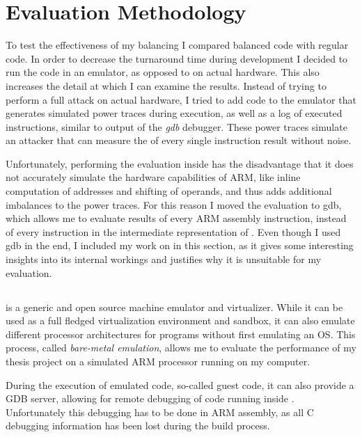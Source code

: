 \chapter{Evaluation Methodology}
\label{evaluation}
To test the effectiveness of my balancing I compared balanced code with regular code.
In order to decrease the turnaround time during development I decided to run the code in an emulator, as opposed to on actual hardware.
This also increases the detail at which I can examine the results.
Instead of trying to perform a full \poweranalysis{} attack on actual hardware, I tried to add code to the \qemu{} emulator that generates simulated power traces during execution, as well as a log of executed instructions, similar to output of the \emph{gdb} debugger.
These power traces simulate an attacker that can measure the \hammingw{} of every single instruction result without noise.

Unfortunately, performing the evaluation inside \qemu{} has the disadvantage that it does not accurately simulate the hardware capabilities of ARM, like inline computation of addresses and shifting of operands, and thus adds additional imbalances to the power traces.
For this reason I moved the evaluation to gdb, which allows me to evaluate results of every ARM assembly instruction, instead of every instruction in the intermediate representation of \qemu{}.
Even though I used gdb in the end, I included my work on \qemu{} in this section, as it gives some interesting insights into its internal workings and justifies why it is unsuitable for my evaluation.

\section{\qemu{}}
\qemu{} is a generic and open source machine emulator and virtualizer.\cite{bellard2005qemu}
While it can be used as a full fledged virtualization environment and sandbox, it can also emulate different processor architectures for programs without first emulating an OS.
This process, called \emph{bare-metal emulation}, allows me to evaluate the performance of my thesis project on a simulated ARM processor running on my computer.

During the execution of emulated code, so-called guest code, it can also provide a GDB server, allowing for remote debugging of code running inside \qemu{}.
Unfortunately this debugging has to be done in ARM assembly, as all C debugging information has been lost during the build process.

